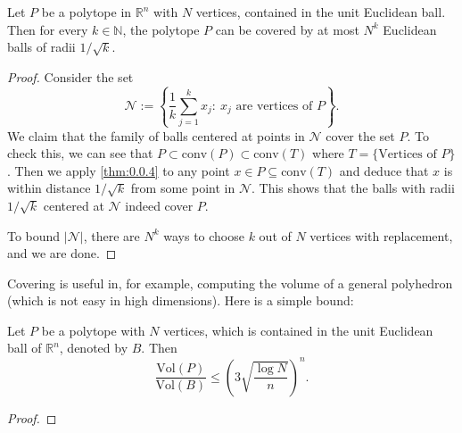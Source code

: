 \begin{corollary}
\label{cor:0.0.5}
Let $P$ be a polytope in $\mathbb{R}^n$ with $N$ vertices, contained in the unit Euclidean ball. Then 
for every $k \in \mathbb{N}$, the polytope $P$ can be covered by at most $N^k$ Euclidean balls of radii $
1 / \sqrt{k}$.
\end{corollary}

\begin{proof}
Consider the set 
\[ \mathcal{N} := \left\{ \frac{1}{k}\sum_{j = 1}^{k} x_j: \ x_j 
\text{ are vertices of } P \right\}. \]
We claim that the family of balls centered at points in $\mathcal{N}$ cover the set $P$. To check this, we 
can see that $P \subset \text{conv}(P) \subset \text{conv}(T)$ where $T = \{\text{Vertices of } P\}$. 
Then we apply \cref{thm:0.0.4} to any point $x \in P \subseteq \text{conv}(T)$ and deduce that $x$ is within 
distance $1/\sqrt{k}$ from some point in $\mathcal{N}$. This shows that the balls with radii $1/\sqrt{k}$ 
centered at $\mathcal{N}$ indeed cover $P$. 

To bound $|\mathcal{N}|$, there are $N^k$ ways to choose $k$ out of $N$ vertices with replacement, and 
we are done.	
\end{proof}

Covering is useful in, for example, computing the volume of a general polyhedron (which is not easy in 
high dimensions). Here is a simple bound: 
\begin{theorem}[]
\label{thm:0.0.6}
Let $P$ be a polytope with $N$ vertices, which is contained in the unit Euclidean ball of $\mathbb{R}^n$, 
denoted by $B$. Then 
\[ \frac{\text{Vol}(P)}{\text{Vol}(B)} \leq \left( 3 \sqrt{\frac{\log{N}}{n}} \right)^n. \]
\end{theorem}

\begin{proof}

\end{proof}
